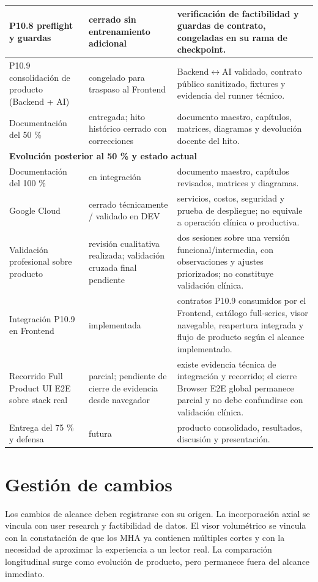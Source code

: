 \begin{longtable}{|p{}|p{}|p{}|}
\hline
P10.8 preflight y guardas & cerrado sin entrenamiento adicional & verificación de factibilidad y guardas de contrato, congeladas en su rama de checkpoint. \\
\hline
P10.9 consolidación de producto (Backend + AI) & congelado para traspaso al Frontend & Backend\ensuremath{\leftrightarrow}AI validado, contrato público sanitizado, fixtures y evidencia del runner técnico. \\
\hline
Documentación del 50 \% & entregada; hito histórico cerrado con correcciones & documento maestro, capítulos, matrices, diagramas y devolución docente del hito. \\
\hline
\multicolumn{3}{|l|}{\textbf{Evolución posterior al 50 \% y estado actual}} \\
\hline
Documentación del 100 \% & en integración & documento maestro, capítulos revisados, matrices y diagramas. \\
\hline
Google Cloud & cerrado técnicamente / validado en DEV & servicios, costos, seguridad y prueba de despliegue; no equivale a operación clínica o productiva. \\
\hline
Validación profesional sobre producto & revisión cualitativa realizada; validación cruzada final pendiente & dos sesiones sobre una versión funcional/intermedia, con observaciones y ajustes priorizados; no constituye validación clínica. \\
\hline
Integración P10.9 en Frontend & implementada & contratos P10.9 consumidos por el Frontend, catálogo full-series, visor navegable, reapertura integrada y flujo de producto según el alcance implementado. \\
\hline
Recorrido Full Product UI E2E sobre stack real & parcial; pendiente de cierre de evidencia desde navegador & existe evidencia técnica de integración y recorrido; el cierre Browser E2E global permanece parcial y no debe confundirse con validación clínica. \\
\hline
Entrega del 75 \% y defensa & futura & producto consolidado, resultados, discusión y presentación. \\
\hline
\end{longtable}
\endgroup

\section{Gestión de cambios}

Los cambios de alcance deben registrarse con su origen. La incorporación axial se vincula con user research y factibilidad de datos. El visor volumétrico se vincula con la constatación de que los MHA ya contienen múltiples cortes y con la necesidad de aproximar la experiencia a un lector real. La comparación longitudinal surge como evolución de producto, pero permanece fuera del alcance inmediato.

